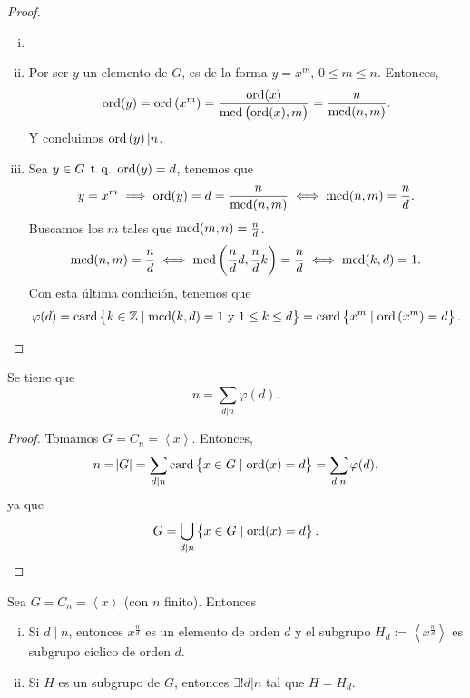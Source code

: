 \begin{proof}
    \begin{enumerate}[i)]
        \item[]
        \item Por ser $y$ un elemento de $G$, es de la forma $y=x^m,\,0\leq m\leq n$. Entonces,
                \[
                    \operatorname{ord}(y) = \operatorname{ord}\left( x^m \right) = \frac{\operatorname{ord}(x)}{\operatorname{mcd}\left(\operatorname{ord}(x), m \right)} = \frac{n}{\operatorname{mcd}(n, m)}.
                \]
            Y concluimos $\operatorname{ord}\left( y\right) \vert n$.
        \item Sea $y \in G \operatorname{\;t.q.\;} \operatorname{ord}(y) = d$, tenemos que
                \[
                    y = x^m \implies \operatorname{ord}(y) = d = \frac{n}{\operatorname{mcd}(n, m)} \iff \operatorname{mcd}(n, m) = \frac{n}{d}.
                \]
                Buscamos los $m$ tales que $\operatorname{mcd}(m, n) = \frac{n}{d}$.
                \[
                    \operatorname{mcd}(n, m) = \frac{n}{d} \iff \operatorname{mcd}\left( \frac{n}{d}d, \frac{n}{d}k \right) = \frac{n}{d}
                    \iff \operatorname{mcd}(k, d) = 1.
                \]
                Con esta última condición, tenemos que
                \[
                    \varphi(d) = \operatorname{card} \left\{ k \in \mathbb{Z} \mid \operatorname{mcd}(k, d) = 1 \text{ y } 1 \leq k \leq d\right\}
                    = \operatorname{card} \left\{ x^m \mid \operatorname{ord}\left( x^m \right) = d\right\}.
                \]
    \end{enumerate}
\end{proof}

\begin{col}
    Se tiene que
    \[
        n = \sum_{d \vert n} \varphi(d).
    \]
\end{col}

\begin{proof}
    Tomamos $G = C_n = \left< x \right>$. Entonces,
    \[
        n = \abs{G} = \sum_{d \vert n} \operatorname{card} \left\{ x \in G \mid \operatorname{ord}(x) =d \right\} = \sum_{d \vert n} \varphi(d),
    \]
    ya que
    \[
        G = \bigcup_{d \vert n} \left\{x \in G \mid \operatorname{ord}(x) = d\right\}.
    \]
\end{proof}

\begin{prop}
    Sea $G = C_n = \left< x \right>$ (con $n$ finito). Entonces
    \begin{enumerate}[i)]
        \item Si $d \mid n$, entonces $x^{\frac{n}{d}}$ es un elemento de orden $d$
            y el subgrupo $H_d := \left< x^{\frac{n}{d}} \right>$ es subgrupo cíclico de orden $d$.
        \item Si $H$ es un subgrupo de $G$, entonces $\exists! d \vert n$ tal que $H = H_d$.
    \end{enumerate}
\end{prop}

